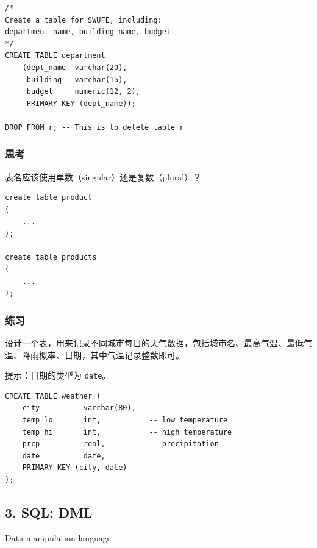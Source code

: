 \documentclass[aspectratio=169, 14pt]{beamer}
\begin{document}
\begin{frame}[fragile]
	\begin{verbatim}
/*
Create a table for SWUFE, including:
department name, building name, budget
*/        
CREATE TABLE department
    (dept_name  varchar(20),
     building   varchar(15),
     budget     numeric(12, 2),
     PRIMARY KEY (dept_name)); 

DROP FROM r; -- This is to delete table r
    \end{verbatim}
\end{frame}
\begin{frame}[fragile]
	\frametitle{思考}
	{\large {}} 表名应该使用单数（singular）还是复数（plural）？

	\begin{verbatim}
create table product
(
    ...
);

create table products
(
    ...
);
\end{verbatim}
\end{frame}
\begin{frame}
	\frametitle{练习}

	{\large {}} 设计一个表，用来记录不同城市每日的天气数据，包括城市名、最高气温、最低气温、降雨概率、日期，其中气温记录整数即可。

	提示：日期的类型为 \texttt{date}。
\end{frame}

\begin{frame}[fragile]
	\begin{verbatim}
CREATE TABLE weather (
    city          varchar(80),
    temp_lo       int,           -- low temperature
    temp_hi       int,           -- high temperature
    prcp          real,          -- precipitation
    date          date,
    PRIMARY KEY (city, date)
);
    \end{verbatim}
\end{frame}

\begin{frame}
	\section{\textcolor{darkmidnightblue}{3. SQL: DML}}
	Data manipulation language

\end{frame}
\end{document}
